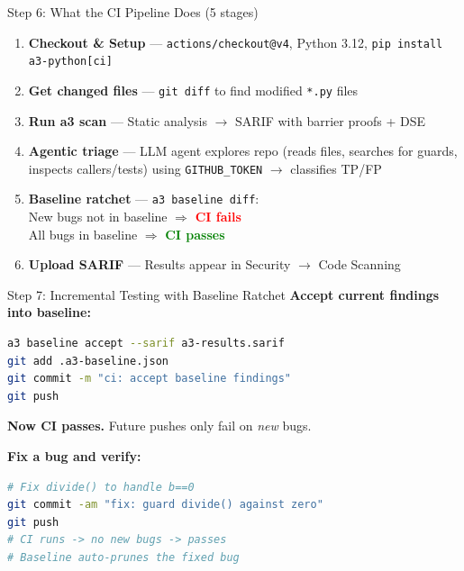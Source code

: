 \documentclass[aspectratio=169]{beamer}
\begin{document}
\begin{frame}{Step 6: What the CI Pipeline Does (5 stages)}
\begin{enumerate}
  \item \textbf{Checkout \& Setup} — \texttt{actions/checkout@v4}, Python 3.12, \texttt{pip install a3-python[ci]}
  \item \textbf{Get changed files} — \texttt{git diff} to find modified \texttt{*.py} files
  \item \textbf{Run a3 scan} — Static analysis $\to$ SARIF with barrier proofs + DSE
  \item \textbf{Agentic triage} — LLM agent explores repo (reads files, searches for guards, inspects callers/tests) using \texttt{GITHUB\_TOKEN} $\to$ classifies TP/FP
  \item \textbf{Baseline ratchet} — \texttt{a3 baseline diff}: \\
    \quad New bugs not in baseline $\Rightarrow$ \textcolor{red}{\textbf{CI fails}} \\
    \quad All bugs in baseline $\Rightarrow$ \textcolor{green}{\textbf{CI passes}}
  \item \textbf{Upload SARIF} — Results appear in Security $\to$ Code Scanning
\end{enumerate}
\end{frame}

\begin{frame}[fragile]{Step 7: Incremental Testing with Baseline Ratchet}
\textbf{Accept current findings into baseline:}
\begin{lstlisting}[language=bash]
a3 baseline accept --sarif a3-results.sarif
git add .a3-baseline.json
git commit -m "ci: accept baseline findings"
git push
\end{lstlisting}

\textbf{Now CI passes.} Future pushes only fail on \emph{new} bugs.

\medskip
\textbf{Fix a bug and verify:}
\begin{lstlisting}[language=bash]
# Fix divide() to handle b==0
git commit -am "fix: guard divide() against zero"
git push
# CI runs -> no new bugs -> passes
# Baseline auto-prunes the fixed bug
\end{lstlisting}
\end{frame}
\end{document}
